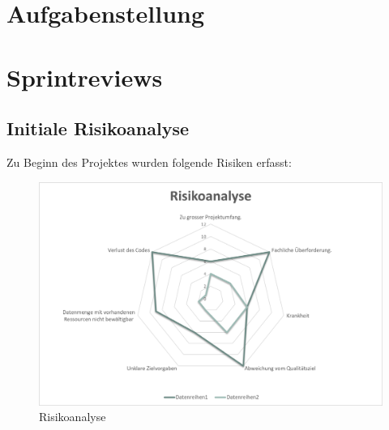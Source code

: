 % 

\chapter{Aufgabenstellung}
\label{app:sec:Aufgabenstellung}


\chapter{Sprintreviews}
\section*{Initiale Risikoanalyse}
Zu Beginn des Projektes wurden folgende Risiken erfasst:

\begin{figure}[htb]
	\centering
	\includegraphics[keepaspectratio,width=\linewidth]{img/Initiale Risikoanalyse.png}
	\caption{Risikoanalyse}
	\label{fig:InitialeRisikoanalyse}
\end{figure}

